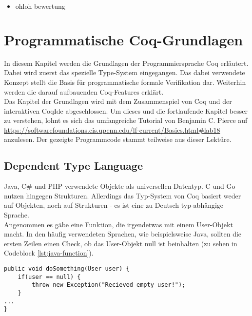 \begin{itemize}
	\item ohloh bewertung
\end{itemize}

\section{Programmatische Coq-Grundlagen}
In diesem Kapitel werden die Grundlagen der Programmiersprache Coq erläutert. Dabei wird zuerst das spezielle Type-System eingegangen. Das dabei verwendete Konzept stellt die Basis für programmatische formale Verifikation dar. Weiterhin werden die darauf aufbauenden Coq-Features erklärt.\\
Das Kapitel der Grundlagen wird mit dem Zusammenspiel von Coq und der interaktiven CoqIde abgeschlossen. Um dieses und die fortlaufende Kapitel besser zu verstehen, lohnt es sich das umfangreiche Tutorial von Benjamin C. Pierce auf \url{https://softwarefoundations.cis.upenn.edu/lf-current/Basics.html#lab18} anzulesen. Der gezeigte Programmcode stammt teilweise aus dieser Lektüre.\cite{Pierce01:COQ}

\subsection{Dependent Type Language}
Java, C\# und PHP verwendete Objekte als universellen Datentyp. C und Go nutzen hingegen Strukturen. Allerdings das Typ-System von Coq basiert weder auf Objekten, noch auf Strukturen - es ist eine zu Deutsch typ-abhängige Sprache.\\
Angenommen es gäbe eine Funktion, die irgendetwas mit einem User-Objekt macht. In den häufig verwendeten Sprachen, wie beispielsweise Java, sollten die ersten Zeilen einen Check, ob das User-Objekt null ist beinhalten (zu sehen in Codeblock \ref{lst:java-function}).
\begin{lstlisting}[language=coq,firstnumber=1,caption=Java Funktion für den initialen Check auf null des User Objektes,label=lst:java-function]
public void doSomething(User user) {
	if(user == null) {
		throw new Exception("Recieved empty user!");
	}
...
}
\end{lstlisting}

